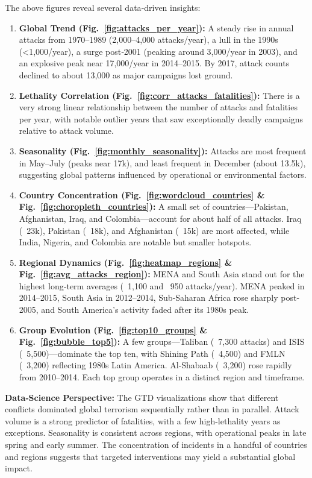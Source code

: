 The above figures reveal several data‐driven insights:

\begin{enumerate}
  \item \textbf{Global Trend (Fig.~\ref{fig:attacks_per_year}):} 
    A steady rise in annual attacks from 1970–1989 (2,000–4,000 attacks/year), a lull in the 1990s (<1,000/year), a surge post‐2001 (peaking around 3,000/year in 2003), and an explosive peak near 17,000/year in 2014–2015. By 2017, attack counts declined to about 13,000 as major campaigns lost ground.
  \item \textbf{Lethality Correlation (Fig.~\ref{fig:corr_attacks_fatalities}):} 
    There is a very strong linear relationship between the number of attacks and fatalities per year, with notable outlier years that saw exceptionally deadly campaigns relative to attack volume.
  \item \textbf{Seasonality (Fig.~\ref{fig:monthly_seasonality}):} 
    Attacks are most frequent in May–July (peaks near 17k), and least frequent in December (about 13.5k), suggesting global patterns influenced by operational or environmental factors.
  \item \textbf{Country Concentration (Fig.~\ref{fig:wordcloud_countries} \& Fig.~\ref{fig:choropleth_countries}):} 
    A small set of countries—Pakistan, Afghanistan, Iraq, and Colombia—account for about half of all attacks. Iraq (~23k), Pakistan (~18k), and Afghanistan (~15k) are most affected, while India, Nigeria, and Colombia are notable but smaller hotspots.
  \item \textbf{Regional Dynamics (Fig.~\ref{fig:heatmap_regions} \& Fig.~\ref{fig:avg_attacks_region}):} 
    MENA and South Asia stand out for the highest long‐term averages (~1,100 and ~950 attacks/year). MENA peaked in 2014–2015, South Asia in 2012–2014, Sub‐Saharan Africa rose sharply post‐2005, and South America’s activity faded after its 1980s peak.
  \item \textbf{Group Evolution (Fig.~\ref{fig:top10_groups} \& Fig.~\ref{fig:bubble_top5}):} 
    A few groups—Taliban (~7,300 attacks) and ISIS (~5,500)—dominate the top ten, with Shining Path (~4,500) and FMLN (~3,200) reflecting 1980s Latin America. Al‐Shabaab (~3,200) rose rapidly from 2010–2014. Each top group operates in a distinct region and timeframe.
\end{enumerate}

\noindent
\textbf{Data‐Science Perspective:}  
The GTD visualizations show that different conflicts dominated global terrorism sequentially rather than in parallel. Attack volume is a strong predictor of fatalities, with a few high-lethality years as exceptions. Seasonality is consistent across regions, with operational peaks in late spring and early summer. The concentration of incidents in a handful of countries and regions suggests that targeted interventions may yield a substantial global impact.

